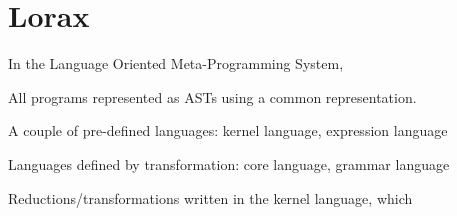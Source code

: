 \section{Lorax}
\label{lorax}

In the Language Oriented Meta-Programming System, 

All programs represented as ASTs using a common representation.

A couple of pre-defined languages: kernel language, expression language

Languages defined by transformation: core language, grammar language

Reductions/transformations written in the kernel language, which 